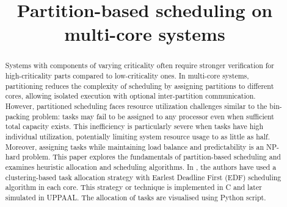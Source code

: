 \documentclass[conference]{IEEEtran}
\begin{document}
\title{Partition-based scheduling on multi-core systems\\
}

\author{
}

\maketitle

\begin{abstract}
Systems with components of varying criticality often require stronger verification for high-criticality parts compared to low-criticality ones. In multi-core systems, partitioning reduces the complexity of scheduling by assigning partitions to different cores, allowing isolated execution with optional inter-partition communication. However, partitioned scheduling faces resource utilization challenges similar to the bin-packing problem: tasks may fail to be assigned to any processor even when sufficient total capacity exists. This inefficiency is particularly severe when tasks have high individual utilization, potentially limiting system resource usage to as little as half. Moreover, assigning tasks while maintaining load balance and predictability is an NP-hard problem. This paper explores the fundamentals of partition-based scheduling and examines heuristic allocation and scheduling algorithms. In \cite{AbdallahGB24}, the authors have used a clustering-based task allocation strategy with Earlest Deadline First (EDF) scheduling algorithm in each core. This strategy or technique is implemented in C and later simulated in UPPAAL. The allocation of tasks are visualised using Python script.


\end{abstract}
\end{document}
